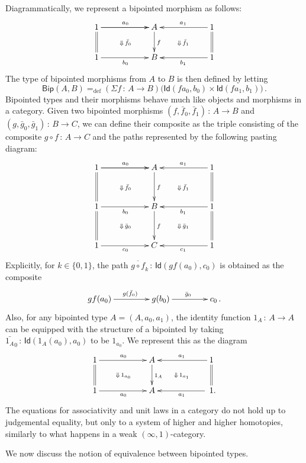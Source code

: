 \documentclass[10pt,a4paper,oneside,reqno]{amsart}
\numberwithin{equation}{section}
\theoremstyle{mythm}
\theoremstyle{mydef}
\theoremstyle{myrmk}
\newcommand{\defeq}{=_{\mathrm{def}}}
\newcommand{\co}{\,{:}\,}
\newcommand{\Id}{\mathsf{Id}}
\newcommand{\BipHom}{\mathsf{Bip}}
\begin{document}
Diagrammatically, we represent a bipointed morphism as follows:
\[
\xymatrix@C=2cm{
1 \ar[r]   \ar[r]^{a_0} \ar@{=}[d]  \ar@{}[dr]|{\Downarrow \, \bar{f}_0} & A  \ar[d]^{f} & 1  \ar[l]_{a_1} \ar@{=}[d] \ar@{}[dl]|{\Downarrow \,  \bar{f}_1} \\
1 \ar[r]_{b_0}  & B   & 1 \ar[l]^{b_1} }
 \]
The type of bipointed morphisms from $A$ to $B$ is then defined by letting
\[
\BipHom(A,B) \defeq (\Sigma f \co A \to B) \big( \Id(  f a_0, b_0 )  \times \Id(  f a_1 , b_1 )  \big) \, .
\]
 Bipointed types and their morphisms behave much like objects and morphisms in a category.
Given two bipointed morphisms  $(f, \bar{f}_0, \bar{f}_1) \co A \to B$ and $(g, \bar{g}_0, \bar{g}_1) \co B \to C$, we can define their composite 
 as the triple consisting of the composite $g \circ f \co A \to C$ and the paths represented
by the following pasting diagram:
\[
\xymatrix@C=2cm@R=1.2cm{
1 \ar[r]   \ar[r]^{a_0} \ar@{=}[d]  \ar@{}[dr]|{\Downarrow \, \bar{f}_0} & A  \ar[d]^{f} & 1  \ar[l]_{a_1} \ar@{=}[d] \ar@{}[dl]|{\Downarrow \,  \bar{f}_1} \\
1 \ar[r]_{b_0}   \ar@{}[dr]|{\Downarrow \, \bar{g}_0}  \ar@{=}[d] & B \ar[d]^f   & 1 \ar[l]^{b_1} \ar@{=}[d] \ar@{}[dl]|{\Downarrow \,  \bar{g}_1} \\
1 \ar[r]_{c_0}  & C   & 1 \ar[l]^{c_1}}
 \]
Explicitly, for $k \in \{ 0, 1 \}$, the path $\overline{g \circ f}_k \co \Id( g f( a_0), c_0)$ is obtained as the composite
\[
\xymatrix@C=1.5cm{
g f (a_0) \ar[r]^{g(\bar{f}_0)} & g(b_0) \ar[r]^{\bar{g}_0} & c_0 \, .}
\]
Also, for any bipointed type $A = (A, a_0, a_1)$, the identity function $1_A \co A \to A$ can be equipped with the structure of a bipointed by taking $\bar{1_A}_0 \co \Id( 1_A(a_0), a_0)$ to be $1_{a_0}$. We represent this as the
diagram
 \begin{equation}
 \label{equ:bipidA}
{\vcenter{\hbox{\xymatrix@C=2cm{
1 \ar[r]^{a_0} \ar@{=}[d] \ar@{}[dr]|{\Downarrow \, 1_{a_0}}& A \ar[d]^{1_A} & 
1 \ar[l]_{a_1} \ar@{=}[d]  \ar@{}[dl]|{\Downarrow \, 1_{a_1}}  \\ 
 1 \ar[r]_{a_0} & A & \; 1 .\ar[l]^{a_1} }}}}
 \end{equation}
The equations for associativity and unit laws in a category do not hold up to judgemental equality, but only 
to a system of higher and higher homotopies, similarly to what happens in a weak $(\infty,1)$-category.  

\medskip

We now discuss the notion of equivalence between bipointed types.
\end{document}
